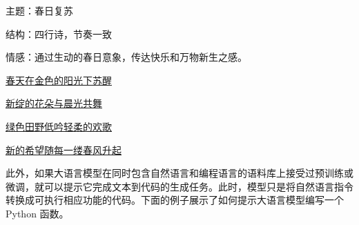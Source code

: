 \vspace{0.5em}
\begin{tcolorbox}

\begingroup
\setlength{\leftskip}{2em}
\setlength{\rightskip}{2em}


\vspace{0.7em}

主题：春日复苏

\vspace{0.3em}

结构：四行诗，节奏一致

\vspace{0.3em}

情感：通过生动的春日意象，传达快乐和万物新生之感。

\vspace{1.0em}

\underline{春天在金色的阳光下苏醒}

\vspace{0.7em}

\underline{新绽的花朵与晨光共舞}

\vspace{0.3em}

\underline{绿色田野低吟轻柔的欢歌}

\vspace{0.3em}

\underline{新的希望随每一缕春风升起}

\endgroup

\end{tcolorbox}
\vspace{0.5em}

此外，如果大语言模型在同时包含自然语言和编程语言的语料库上接受过预训练或微调，就可以提示它完成文本到代码的生成任务。此时，模型只是将自然语言指令转换成可执行相应功能的代码。下面的例子展示了如何提示大语言模型编写一个 Python 函数。

